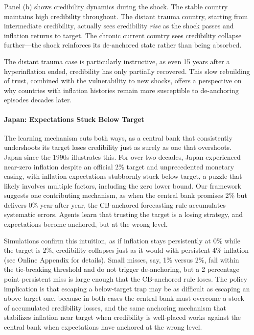 \documentclass[10pt]{article}
\begin{document}
Panel (b) shows credibility dynamics during the shock. The stable country maintains high credibility throughout. The distant trauma country, starting from intermediate credibility, actually sees credibility \textit{rise} as the shock passes and inflation returns to target. The chronic current country sees credibility collapse further---the shock reinforces its de-anchored state rather than being absorbed.

The distant trauma case is particularly instructive, as even 15 years after a hyperinflation ended, credibility has only partially recovered. This slow rebuilding of trust, combined with the vulnerability to new shocks, offers a perspective on why countries with inflation histories remain more susceptible to de-anchoring episodes decades later.

\paragraph{Japan: Expectations Stuck Below Target} The learning mechanism cuts both ways, as a central bank that consistently undershoots its target loses credibility just as surely as one that overshoots. Japan since the 1990s illustrates this. For over two decades, Japan experienced near-zero inflation despite an official 2\% target and unprecedented monetary easing, with inflation expectations stubbornly stuck below target, a puzzle that likely involves multiple factors, including the zero lower bound. Our framework suggests one contributing mechanism, as when the central bank promises 2\% but delivers 0\% year after year, the CB-anchored forecasting rule accumulates systematic errors. Agents learn that trusting the target is a losing strategy, and expectations become anchored, but at the wrong level.

Simulations confirm this intuition, as if inflation stays persistently at 0\% while the target is 2\%, credibility collapses just as it would with persistent 4\% inflation (see Online Appendix for details). Small misses, say, 1\% versus 2\%, fall within the tie-breaking threshold and do not trigger de-anchoring, but a 2 percentage point persistent miss is large enough that the CB-anchored rule loses. The policy implication is that escaping a below-target trap may be as difficult as escaping an above-target one, because in both cases the central bank must overcome a stock of accumulated credibility losses, and the same anchoring mechanism that stabilizes inflation near target when credibility is well-placed works against the central bank when expectations have anchored at the wrong level.
\end{document}
